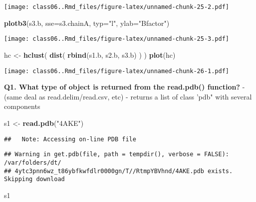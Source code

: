 \documentclass[]{article}
\newenvironment{Shaded}{\begin{snugshade}}{\end{snugshade}}
\newcommand{\DataTypeTok}[1]{\textcolor[rgb]{0.13,0.29,0.53}{#1}}
\newcommand{\KeywordTok}[1]{\textcolor[rgb]{0.13,0.29,0.53}{\textbf{#1}}}
\newcommand{\NormalTok}[1]{#1}
\newcommand{\StringTok}[1]{\textcolor[rgb]{0.31,0.60,0.02}{#1}}
\begin{document}
\texttt{[image: class06..Rmd\_files/figure-latex/unnamed-chunk-25-2.pdf]}

\begin{Shaded}
\begin{Highlighting}[]
\KeywordTok{plotb3}\NormalTok{(s3.b, }\DataTypeTok{sse=}\NormalTok{s3.chainA, }\DataTypeTok{typ=}\StringTok{"l"}\NormalTok{, }\DataTypeTok{ylab=}\StringTok{"Bfactor"}\NormalTok{)}
\end{Highlighting}
\end{Shaded}

\texttt{[image: class06..Rmd\_files/figure-latex/unnamed-chunk-25-3.pdf]}

\begin{Shaded}
\begin{Highlighting}[]
\NormalTok{hc <-}\StringTok{ }\KeywordTok{hclust}\NormalTok{( }\KeywordTok{dist}\NormalTok{( }\KeywordTok{rbind}\NormalTok{(s1.b, s2.b, s3.b) ) )}
\KeywordTok{plot}\NormalTok{(hc)}
\end{Highlighting}
\end{Shaded}

\texttt{[image: class06..Rmd\_files/figure-latex/unnamed-chunk-26-1.pdf]}

\textbf{Q1. What type of object is returned from the read.pdb()
function?} - (same deal as read.delim/read.csv, etc) - returns a list of
class 'pdb" with several components

\begin{Shaded}
\begin{Highlighting}[]
\NormalTok{s1 <-}\StringTok{ }\KeywordTok{read.pdb}\NormalTok{(}\StringTok{"4AKE"}\NormalTok{)}
\end{Highlighting}
\end{Shaded}

\begin{verbatim}
##   Note: Accessing on-line PDB file
\end{verbatim}

\begin{verbatim}
## Warning in get.pdb(file, path = tempdir(), verbose = FALSE): /var/folders/dt/
## 4ytc3pnn6wz_t86ybfkwfdlr0000gn/T//RtmpYBVhnd/4AKE.pdb exists. Skipping download
\end{verbatim}

\begin{Shaded}
\begin{Highlighting}[]
\NormalTok{s1}
\end{Highlighting}
\end{Shaded}
\end{document}

